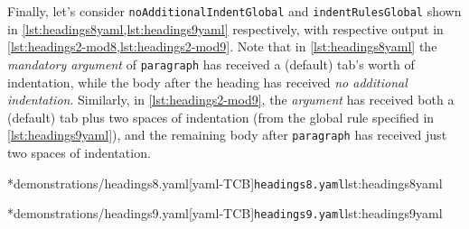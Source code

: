 	Finally, let's consider \texttt{noAdditionalIndentGlobal} and \texttt{indentRulesGlobal} shown in \cref{lst:headings8yaml,lst:headings9yaml} respectively, with respective output in \cref{lst:headings2-mod8,lst:headings2-mod9}.
	Note that in \cref{lst:headings8yaml} the \emph{mandatory argument} of \texttt{paragraph} has received a (default) tab's worth of indentation, while the body after the heading has received \emph{no additional indentation}.
	Similarly, in \cref{lst:headings2-mod9}, the \emph{argument} has received both a (default) tab plus two spaces of indentation (from the global rule specified in \cref{lst:headings9yaml}), and the remaining body after \texttt{paragraph} has received just two spaces of indentation.

	\begin{minipage}{.45\textwidth}
	\end{minipage}%
	\hfill
	\begin{minipage}{.45\textwidth}
		\cmhlistingsfromfile[style=yaml-LST]*{demonstrations/headings8.yaml}[yaml-TCB]{\texttt{headings8.yaml}}{lst:headings8yaml}
	\end{minipage}

	\begin{minipage}{.45\textwidth}
	\end{minipage}%
	\hfill
	\begin{minipage}{.45\textwidth}
		\cmhlistingsfromfile[style=yaml-LST]*{demonstrations/headings9.yaml}[yaml-TCB]{\texttt{headings9.yaml}}{lst:headings9yaml}
	\end{minipage}
